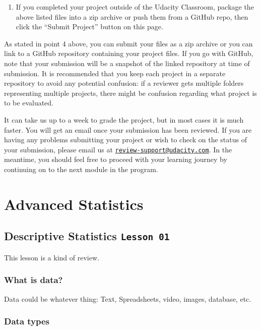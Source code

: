 \documentclass[]{book}
\providecommand{\tightlist}{%
  \setlength{\itemsep}{0pt}\setlength{\parskip}{0pt}}
\begin{document}
\begin{enumerate}
\def\labelenumi{\arabic{enumi}.}
\setcounter{enumi}{3}
\tightlist
\item
  If you completed your project outside of the Udacity Classroom,
  package the above listed files into a zip archive or push them from a
  GitHub repo, then click the ``Submit Project'' button on this page.
\end{enumerate}

As stated in point 4 above, you can submit your files as a zip archive
or you can link to a GitHub repository containing your project files. If
you go with GitHub, note that your submission will be a snapshot of the
linked repository at time of submission. It is recommended that you keep
each project in a separate repository to avoid any potential confusion:
if a reviewer gets multiple folders representing multiple projects,
there might be confusion regarding what project is to be evaluated.

It can take us up to a week to grade the project, but in most cases it
is much faster. You will get an email once your submission has been
reviewed. If you are having any problems submitting your project or wish
to check on the status of your submission, please email us at
\href{mailto:review-support@udacity.com}{\nolinkurl{review-support@udacity.com}}.
In the meantime, you should feel free to proceed with your learning
journey by continuing on to the next module in the program.

\chapter{Advanced Statistics}\label{advanced-statistics}

\section{\texorpdfstring{Descriptive Statistics
\texttt{Lesson\ 01}}{Descriptive Statistics Lesson 01}}\label{descriptive-statistics-lesson-01}

This lesson is a kind of review.

\subsection{What is data?}\label{what-is-data}

Data could be whatever thing: Text, Spreadsheets, video, images,
database, etc.

\subsection{Data types}\label{data-types}
\end{document}
